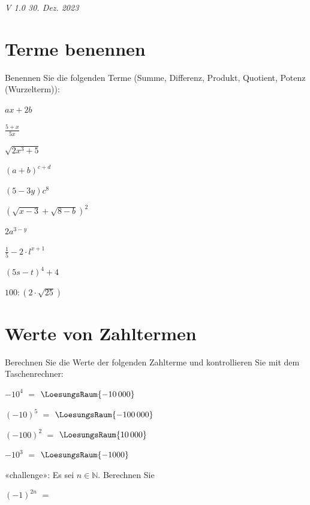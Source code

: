 
\renewcommand{\bbwAufgabenBlockID}{A1Te}

\renewcommand{\metaHeaderLine}{Terme}
\renewcommand{\arbeitsblattTitel}{Algebra: Terme}



\arbeitsblattHeader{}
\begin{center}\textit{\tiny{V 1.0 30. Dez. 2023}}\end{center}

\section{Terme benennen}
Benennen Sie die folgenden Terme (Summe, Differenz, Produkt, Quotient,
Potenz (Wurzelterm)):

\begin{bbwAufgabenBlock}
\item $ax+2b$ \, 
\item $\frac{5+x}{5x}$ \, 
\item $\sqrt{2x^3+5}$ \, 
\item $(a+b)^{c+d}$ \, 
\item $(5-3y)c^8$ \, 
\item $(\sqrt{x-3}+\sqrt{8-b})^2$ \, 
\item $2a^{3-y}$ \, \newpage
\item $\frac15 - 2\cdot{}l^{x+1}$ \, 
\item $(5s-t)^4+4$ \, 
\item $100:(2\cdot{}\sqrt{25})$ \, 
\end{bbwAufgabenBlock}

\newpage


\section{Werte von Zahltermen}
Berechnen Sie die Werte der folgenden Zahlterme und kontrollieren Sie
mit dem Taschenrechner:

\begin{bbwAufgabenBlock}
\item $-10^4$ $=$ $\LoesungsRaum{-10\,000}$
\item $(-10)^5$ $=$ $\LoesungsRaum{-100\,000}$
\item $(-100)^2$ $=$ $\LoesungsRaum{10\,000}$
\item $-10^3$ $=$ $\LoesungsRaum{-1000}$
\item «challenge»: Es sei $n\in\mathbb{N}$. Berechnen Sie 

$(-1)^{2n}$  $=$ 
\end{bbwAufgabenBlock}

